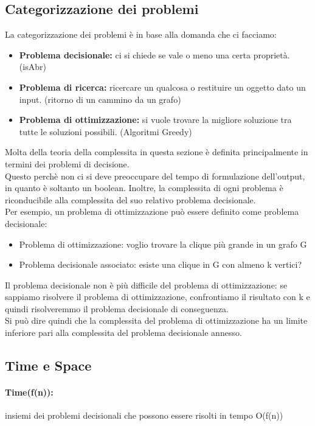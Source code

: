 \documentclass[a4paper,12pt]{article}
\begin{document}
\subsection{Categorizzazione dei problemi}
La categorizzazione dei problemi è in base alla domanda che ci facciamo:
\begin{itemize}
    \item \textbf{Problema decisionale:} ci si chiede se vale o meno una certa proprietà. (isAbr)
    \item \textbf{Problema di ricerca:} ricercare un qualcosa o restituire un oggetto dato un input. (ritorno di un cammino da un grafo)
    \item \textbf{Problema di ottimizzazione:} si vuole trovare la migliore soluzione tra tutte le soluzioni possibili. (Algoritmi Greedy)
\end{itemize}
Molta della teoria della complessita in questa sezione è definita principalmente in termini dei problemi di decisione.\\
Questo perchè non ci si deve preoccupare del tempo di formulazione dell'output, in quanto è soltanto un boolean. Inoltre, la complessita di ogni problema è riconducibile alla complessita del suo relativo problema decisionale.\\
Per esempio, un problema di ottimizzazione può essere definito come problema decisionale:
\begin{itemize}
    \item Problema di ottimizzazione: voglio trovare la clique più grande in un grafo G
    \item Problema decisionale associato: esiste una clique in G con almeno k vertici?
\end{itemize}
Il problema decisionale non è più difficile del problema di ottimizzazione: se sappiamo risolvere il problema di ottimizzazione, confrontiamo il risultato con k e quindi risolveremmo il problema decisionale di conseguenza.\\
Si può dire quindi che la complessita del problema di ottimizzazione ha un limite inferiore pari alla complessita del problema decisionale annesso.
\subsection{Time e Space}
\paragraph{Time(f(n)):} insiemi dei problemi decisionali che possono essere risolti in tempo O(f(n))
\end{document}
